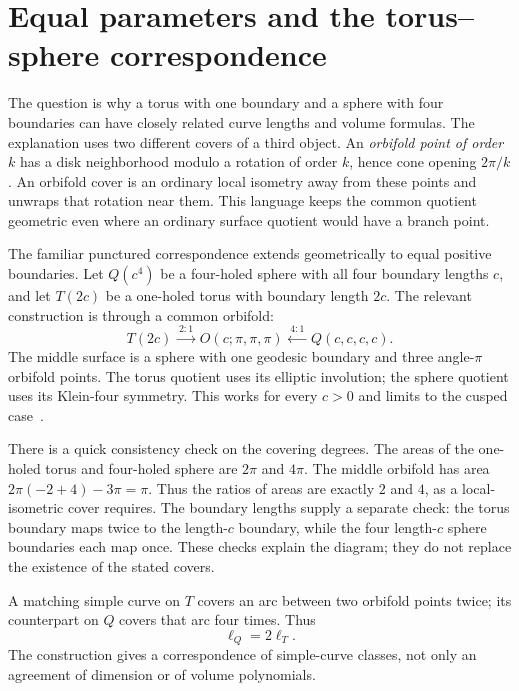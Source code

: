 \section{Equal parameters and the torus--sphere correspondence}
\label{sec:torussphere}

The question is why a torus with one boundary and a sphere with four
boundaries can have closely related curve lengths and volume formulas.
The explanation uses two different covers of a third object. An
\emph{orbifold point of order $k$} has a disk neighborhood modulo a
rotation of order $k$, hence cone opening $2\pi/k$. An orbifold
cover is an ordinary local isometry away from these points and
unwraps that rotation near them. This language keeps the common
quotient geometric even where an ordinary surface quotient would
have a branch point.

The familiar punctured correspondence extends geometrically to equal
positive boundaries. Let $Q(c^4)$ be a four-holed sphere with all four
boundary lengths $c$, and let $T(2c)$ be a one-holed torus with boundary
length $2c$. The relevant construction is through a common orbifold:
\begin{equation}
 T(2c)\xrightarrow{\;2:1\;}
 O(c;\pi,\pi,\pi)
 \xleftarrow{\;4:1\;}Q(c,c,c,c).
 \label{eq:commonorbifold}
\end{equation}
The middle surface is a sphere with one geodesic boundary and three
angle-$\pi$ orbifold points. The torus quotient uses its elliptic
involution; the sphere quotient uses its Klein-four symmetry. This works
for every $c>0$ and limits to the cusped case~\cite[Section 3]{HuTan}.

There is a quick consistency check on the covering degrees.
The areas of the one-holed torus and four-holed sphere are $2\pi$
and $4\pi$. The middle orbifold has area
$2\pi(-2+4)-3\pi=\pi$. Thus the ratios of areas are exactly
$2$ and $4$, as a local-isometric cover requires. The boundary
lengths supply a separate check: the torus boundary maps twice
to the length-$c$ boundary, while the four length-$c$ sphere
boundaries each map once. These checks explain the diagram; they
do not replace the existence of the stated covers.

A matching simple curve on $T$ covers an arc between two orbifold points
twice; its counterpart on $Q$ covers that arc four times. Thus
\begin{equation}
 \ell_Q=2\ell_T.
 \label{eq:lengthtorussphere}
\end{equation}
The construction gives a correspondence of simple-curve classes, not only
an agreement of dimension or of volume polynomials.

